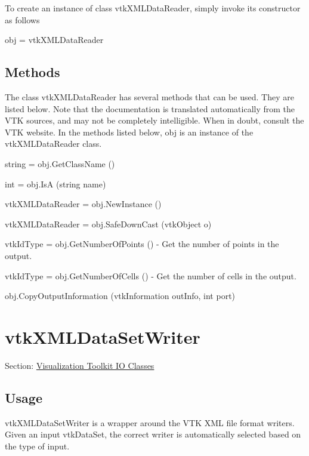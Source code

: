 To create an instance of class vtk\-X\-M\-L\-Data\-Reader, simply invoke its constructor as follows \begin{DoxyVerb}  obj = vtkXMLDataReader
\end{DoxyVerb}
 \hypertarget{vtkwidgets_vtkxyplotwidget_Methods}{}\subsection{Methods}\label{vtkwidgets_vtkxyplotwidget_Methods}
The class vtk\-X\-M\-L\-Data\-Reader has several methods that can be used. They are listed below. Note that the documentation is translated automatically from the V\-T\-K sources, and may not be completely intelligible. When in doubt, consult the V\-T\-K website. In the methods listed below, {\ttfamily obj} is an instance of the vtk\-X\-M\-L\-Data\-Reader class. 
\begin{DoxyItemize}
\item {\ttfamily string = obj.\-Get\-Class\-Name ()}  
\item {\ttfamily int = obj.\-Is\-A (string name)}  
\item {\ttfamily vtk\-X\-M\-L\-Data\-Reader = obj.\-New\-Instance ()}  
\item {\ttfamily vtk\-X\-M\-L\-Data\-Reader = obj.\-Safe\-Down\-Cast (vtk\-Object o)}  
\item {\ttfamily vtk\-Id\-Type = obj.\-Get\-Number\-Of\-Points ()} -\/ Get the number of points in the output.  
\item {\ttfamily vtk\-Id\-Type = obj.\-Get\-Number\-Of\-Cells ()} -\/ Get the number of cells in the output.  
\item {\ttfamily obj.\-Copy\-Output\-Information (vtk\-Information out\-Info, int port)}  
\end{DoxyItemize}\hypertarget{vtkio_vtkxmldatasetwriter}{}\section{vtk\-X\-M\-L\-Data\-Set\-Writer}\label{vtkio_vtkxmldatasetwriter}
Section\-: \hyperlink{sec_vtkio}{Visualization Toolkit I\-O Classes} \hypertarget{vtkwidgets_vtkxyplotwidget_Usage}{}\subsection{Usage}\label{vtkwidgets_vtkxyplotwidget_Usage}
vtk\-X\-M\-L\-Data\-Set\-Writer is a wrapper around the V\-T\-K X\-M\-L file format writers. Given an input vtk\-Data\-Set, the correct writer is automatically selected based on the type of input.


